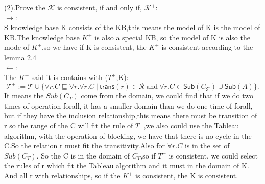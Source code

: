 \documentclass{article}
\begin{document}
    (2).Prove the $\mathcal{K}$ is consistent, if and only if, $\mathcal{K}^{+}$:\\
    $\rightarrow$:\\
    S knowledge base K consists of the KB,this means the model of K is the model of KB.The knowledge base $K^+$ is also a special KB,
    so the model of K is also the mode of $K^+$,so we have if K is consistent, the $K^+$ is consistent according to the lemma 2.4\\
    $\leftarrow$:\\
    The $K^+$ said it is contains with ($T^+$,K):\\
    \[
        \mathcal{T}^{+}:=\mathcal{T}\cup\{\forall r.C\sqsubseteq\forall r.\forall r.C~|~\textsf{trans}(r)\in\mathcal{R}~\text{and}~\forall r.C\in\textsf{Sub}(C_{\mathcal{T}})\cup \textsf{Sub}(A)\}.
    \]
    It means the $Sub(C_T)$ come from the domain, we could find that if we do two times of operation forall, it has a smaller domain than we do one time of forall,
    but if they have the inclusion relationship,this means there must be transition of r so the range of the C will fit the rule of $T^+$,we also could use the Tableau 
    algorithm, with the operation of blocking, we have that there is no cycle in the C.So the relation r must fit the transitivity.Also for $\forall r.C$ is in the set of $Sub(C_T)$.
    So the C is in the domain of $C_T$,so if $T^+$ is consistent, we could select the rules of r which fit the Tableau algorithm and it must in the domain of K. And all r with relationships,
    so if the $K^+$ is consistent, the K is consistent. 
\end{document}
